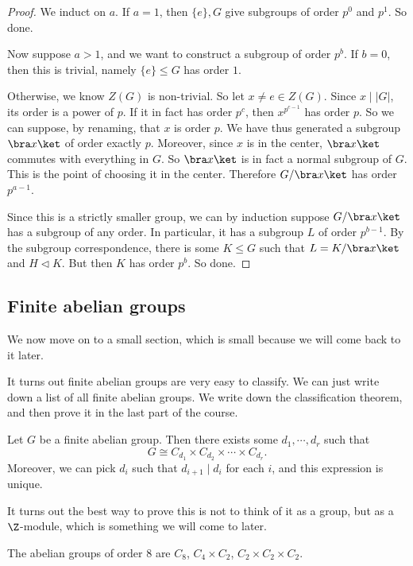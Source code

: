 \documentclass[a4paper]{article}
\begin{document}
\begin{proof}
  We induct on $a$. If $a = 1$, then $\{e\}, G$ give subgroups of order $p^0$ and $p^1$. So done.

  Now suppose $a > 1$, and we want to construct a subgroup of order $p^b$. If $b = 0$, then this is trivial, namely $\{e\} \leq G$ has order $1$.

  Otherwise, we know $Z(G)$ is non-trivial. So let $x \not= e \in Z(G)$. Since $x \mid |G|$, its order is a power of $p$. If it in fact has order $p^c$, then $x^{p^{c - 1}}$ has order $p$. So we can suppose, by renaming, that $x$ is order $p$. We have thus generated a subgroup $\bra x\ket$ of order exactly $p$. Moreover, since $x$ is in the center, $\bra x\ket$ commutes with everything in $G$. So $\bra x\ket$ is in fact a normal subgroup of $G$. This is the point of choosing it in the center. Therefore $G/\bra x\ket$ has order $p^{a - 1}$.

  Since this is a strictly smaller group, we can by induction suppose $G/\bra x\ket$ has a subgroup of any order. In particular, it has a subgroup $L$ of order $p^{b - 1}$. By the subgroup correspondence, there is some $K \leq G$ such that $L = K / \bra x\ket$ and $H \lhd K$. But then $K$ has order $p^b$. So done.
\end{proof}

\subsection{Finite abelian groups}
We now move on to a small section, which is small because we will come back to it later.

It turns out finite abelian groups are very easy to classify. We can just write down a list of all finite abelian groups. We write down the classification theorem, and then prove it in the last part of the course.

\begin{thm}
  Let $G$ be a finite abelian group. Then there exists some $d_1, \cdots, d_r$ such that
  \[
    G \cong C_{d_1} \times C_{d_2} \times \cdots \times C_{d_r}.
  \]
  Moreover, we can pick $d_i$ such that $d_{i + 1} \mid d_i$ for each $i$, and this expression is unique.
\end{thm}
It turns out the best way to prove this is not to think of it as a group, but as a $\Z$-module, which is something we will come to later.

\begin{eg}
  The abelian groups of order $8$ are $C_8$, $C_4 \times C_2$, $C_2 \times C_2 \times C_2$.
\end{eg}
\end{document}
